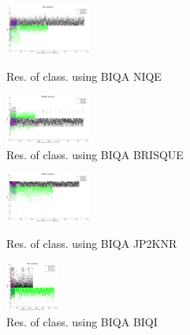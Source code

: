 \begin{figure}
	\begin{minipage}{0.48\linewidth}
		\centering
		\includegraphics[width=0.9\linewidth, height=1.6cm]{pics/biqa_clas_niqe}
		\caption{Res. of class. using BIQA NIQE}
		\label{fig:clas_niqe}
	\end{minipage}
	\hfill
	\begin{minipage}{0.48\linewidth}
		\centering
		\includegraphics[width=0.9\linewidth, height=1.6cm]{pics/biqa_clas_brisque}
		\caption{Res. of class. using BIQA BRISQUE}
		\label{fig:clas_brisque}
	\end{minipage}
\end{figure}
\begin{figure}
	\begin{minipage}{0.48\linewidth}
		\centering
		\includegraphics[width=0.9\linewidth, height=1.6cm]{pics/biqa_clas_jp2knr}
		\caption{Res. of class. using BIQA JP2KNR}
		\label{fig:clas_jp2knr}
	\end{minipage}
	\hfill
	\begin{minipage}{0.48\linewidth}
		\centering
		\includegraphics[width=0.9\linewidth, height=1.6cm]{pics/biqa_clas_biqi}
		\caption{Res. of class. using BIQA BIQI}
		\label{fig:clas_biqi}
	\end{minipage}
\end{figure}
\pagebreak
